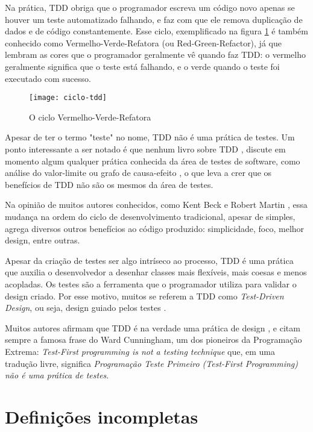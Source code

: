Na prática, TDD obriga que o programador escreva um código novo apenas se houver
um teste automatizado falhando, e faz com que ele remova duplicação de dados e
de código constantemente. Esse ciclo, exemplificado na figura
\ref{fig:red-green-refactor} é também conhecido como Vermelho-Verde-Refatora
(ou Red-Green-Refactor), já que lembram as cores que o programador geralmente
vê quando faz TDD: o vermelho geralmente significa que o teste está falhando, e
o verde quando o teste foi executado com sucesso.

\begin{figure}
  \centering
  \texttt{[image: ciclo-tdd]}
  \caption{O ciclo Vermelho-Verde-Refatora}
  \label{fig:red-green-refactor}
\end{figure}

Apesar de ter o termo "teste" no nome, TDD não é uma prática de testes.
Um ponto interessante a ser notado é que nenhum livro sobre TDD \cite{GOOS}
\cite{TDDByExample} \cite{astels-tdd}, discute em momento algum qualquer
prática conhecida da área de testes de software, como análise do valor-limite ou
grafo de causa-efeito \cite{art-of-sw-testing}, o que leva a crer que os
benefícios de TDD não são os mesmos da área de testes.

Na opinião de muitos autores conhecidos, como Kent Beck \cite{aim-fire} e
Robert Martin \cite{bob-martin}, essa mudança na ordem do ciclo de
desenvolvimento tradicional, apesar de simples, agrega diversos outros
benefícios ao código produzido: simplicidade, foco, melhor design, entre outras.

Apesar da criação de testes ser algo intríseco ao processo, TDD é uma prática
que auxilia o desenvolvedor a desenhar classes mais flexíveis, mais coesas e
menos acopladas. Os testes são a ferramenta que o programador utiliza para
validar o design criado. Por esse motivo, muitos se referem a TDD como
\textit{Test-Driven Design}, ou seja, design guiado pelos testes
\cite{tdd-taxonomy}.

Muitos autores afirmam que TDD é na verdade uma prática de design
\cite{tdd-taxonomy} \cite{aim-fire}, e citam sempre a famosa frase do Ward
Cunningham, um dos pioneiros da Programação Extrema: \textit{Test-First
programming is not a testing technique} que, em uma tradução livre, significa
\textit{Programação Teste Primeiro (Test-First Programming) não é uma prática
de testes}.

\section{Definições incompletas}

